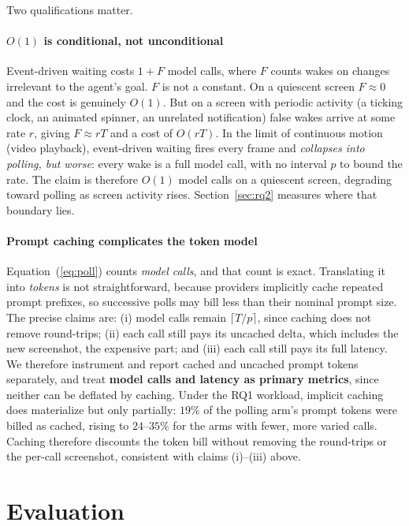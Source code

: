 \documentclass[conference]{IEEEtran}
\begin{document}
Two qualifications matter.

\paragraph{$O(1)$ is conditional, not unconditional}
Event-driven waiting costs $1 + F$ model calls, where $F$ counts wakes on changes
irrelevant to the agent's goal. $F$ is not a constant. On a quiescent screen
$F \approx 0$ and the cost is genuinely $O(1)$. But on a screen with periodic
activity (a ticking clock, an animated spinner, an unrelated notification) false
wakes arrive at some rate $r$, giving $F \approx rT$ and a cost of $O(rT)$. In the
limit of continuous motion (video playback), event-driven waiting fires every
frame and \emph{collapses into polling, but worse}: every wake is a full model
call, with no interval $p$ to bound the rate. The claim is therefore $O(1)$ model
calls on a quiescent screen, degrading toward polling as screen activity rises.
Section~\ref{sec:rq2} measures where that boundary lies.

\paragraph{Prompt caching complicates the token model}
Equation~(\ref{eq:poll}) counts \emph{model calls}, and that count is exact.
Translating it into \emph{tokens} is not straightforward, because providers
implicitly cache repeated prompt prefixes, so successive polls may bill less than
their nominal prompt size. The precise claims are: (i) model calls remain
$\lceil T/p \rceil$, since caching does not remove round-trips; (ii) each call
still pays its uncached delta, which includes the new screenshot, the expensive
part; and (iii) each call still pays its full latency. We therefore instrument and
report cached and uncached prompt tokens separately, and treat \textbf{model
calls and latency as primary metrics}, since neither can be deflated by caching.
Under the RQ1 workload, implicit caching does materialize but only partially:
$19\%$ of the polling arm's prompt tokens were billed as cached, rising to
$24$--$35\%$ for the arms with fewer, more varied calls. Caching therefore
discounts the token bill without removing the round-trips or the per-call
screenshot, consistent with claims (i)--(iii) above.

\section{Evaluation}
\label{sec:eval}
\end{document}
